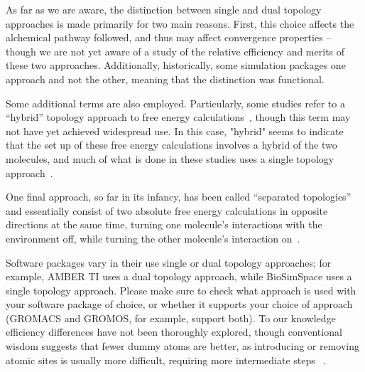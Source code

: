 \documentclass[9pt,bestpractices]{livecoms}
\begin{document}
As far as we are aware, the distinction between single and dual topology approaches is made primarily for two main reasons. First, this choice affects the alchemical pathway followed, and thus may affect convergence properties -- though we are not yet aware of a study of the relative efficiency and merits of these two approaches. Additionally, historically, some simulation packages one approach and not the other, meaning that the distinction was functional. 

Some additional terms are also employed. Particularly, some studies refer to a ``hybrid'' topology approach to free energy calculations~\cite{gapsys2015pmx, gapsys2016accurate, gapsys2020large}, though this term may not have yet achieved widespread use. In this case, "hybrid" seems to indicate that the set up of these free energy calculations involves a hybrid of the two molecules, and much of what is done in these studies uses a single topology approach~\cite{gapsys2020large}.

One final approach, so far in its infancy, has been called ``separated topologies'' and essentially consist of two absolute free energy calculations in opposite directions at the same time, turning one molecule's interactions with the environment off, while turning the other molecule's interaction on~\cite{jiang2019computing, rocklin2013separated}.

Software packages vary in their use single or dual topology approaches; for example, AMBER TI uses a dual topology approach, while BioSimSpace uses a single topology approach. Please make sure to check what approach is used with your software package of choice, or whether it supports your choice of approach (GROMACS and GROMOS, for example, support both). 
To our knowledge efficiency differences have not been thoroughly explored, though conventional wisdom suggests that fewer dummy atoms are better, as introducing or removing atomic sites is usually more difficult, requiring more intermediate steps ~\cite{liu2013lead, mobley2012perspective}.
\end{document}
